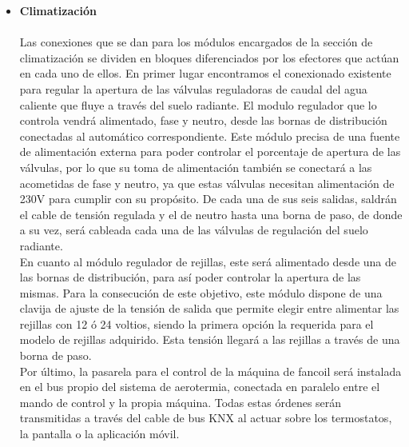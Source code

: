 \begin{itemize}
\item \textbf{Climatización} \\ \\
Las conexiones que se dan para los módulos encargados de la sección de climatización se dividen en bloques diferenciados por los efectores que actúan en cada uno de ellos. En primer lugar encontramos el conexionado existente para regular la apertura de las válvulas reguladoras de caudal del agua caliente que fluye a través del suelo radiante. El modulo regulador que lo controla vendrá alimentado, fase y neutro, desde las bornas de distribución conectadas al automático correspondiente. Este módulo precisa de una fuente de alimentación externa para poder controlar el porcentaje de apertura de las válvulas, por lo que su toma de alimentación también se conectará a las acometidas de fase y neutro, ya que estas válvulas necesitan alimentación de 230V para cumplir con su propósito. De cada una de sus seis salidas, saldrán el cable de tensión regulada y el de neutro hasta una borna de paso, de donde a su vez, será cableada cada una de las válvulas de regulación del suelo radiante.\\
En cuanto al módulo regulador de rejillas, este será alimentado desde una de las bornas de distribución, para así poder controlar la apertura de las mismas. Para la consecución de este objetivo, este módulo dispone de una clavija de ajuste de la tensión de salida que permite elegir entre alimentar las rejillas con 12 ó 24 voltios, siendo la primera opción la requerida para el modelo de rejillas adquirido. Esta tensión llegará a las rejillas a través de una borna de paso.\\
Por último, la pasarela para el control de la máquina de fancoil será instalada en el bus propio del sistema de aerotermia, conectada en paralelo entre el mando de control y la propia máquina. Todas estas órdenes serán transmitidas a través del cable de bus KNX al actuar sobre los termostatos, la pantalla o la aplicación móvil.
\end{itemize} 
